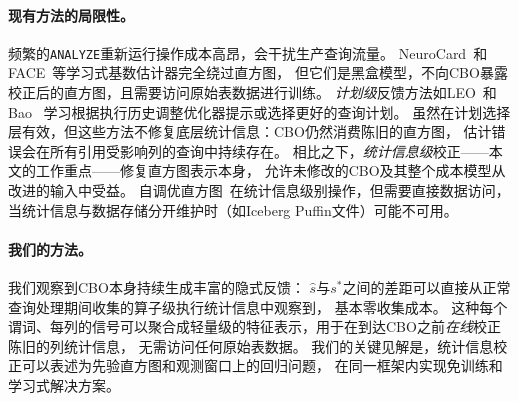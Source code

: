 \documentclass[runningheads]{llncs}
\begin{document}
\paragraph{现有方法的局限性。}
频繁的\texttt{ANALYZE}重新运行操作成本高昂，会干扰生产查询流量。
NeuroCard~\cite{yang2020neurocard}和FACE~\cite{yang2020face}等学习式基数估计器完全绕过直方图，
但它们是黑盒模型，不向CBO暴露校正后的直方图，且需要访问原始表数据进行训练。
\emph{计划级}反馈方法如LEO~\cite{stillger2001leo}和Bao~\cite{marcus2022bao}
学习根据执行历史调整优化器提示或选择更好的查询计划。
虽然在计划选择层有效，但这些方法不修复底层统计信息：CBO仍然消费陈旧的直方图，
估计错误会在所有引用受影响列的查询中持续存在。
相比之下，\emph{统计信息级}校正——本文的工作重点——修复直方图表示本身，
允许未修改的CBO及其整个成本模型从改进的输入中受益。
自调优直方图~\cite{aboulnaga1999self}在统计信息级别操作，但需要直接数据访问，
当统计信息与数据存储分开维护时（如Iceberg Puffin文件）可能不可用。

\paragraph{我们的方法。}
我们观察到CBO本身持续生成丰富的隐式反馈：
$\hat{s}$与$s^*$之间的差距可以直接从正常查询处理期间收集的算子级执行统计信息中观察到，
基本零收集成本。
这种每个谓词、每列的信号可以聚合成轻量级的特征表示，用于在到达CBO之前\emph{在线}校正陈旧的列统计信息，
无需访问任何原始表数据。
我们的关键见解是，统计信息校正可以表述为先验直方图和观测窗口上的回归问题，
在同一框架内实现免训练和学习式解决方案。
\end{document}
